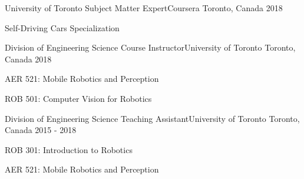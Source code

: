 

\begin{cventries}

  \cventry
    {University of Toronto} %
    {Subject Matter Expert{\awesomesep}Coursera} %
    {Toronto, Canada} %
    {2018} %
    {
      \begin{cvitems} %
        \item {Self-Driving Cars Specialization}
      \end{cvitems}
    }
    
  \cventry
    {Division of Engineering Science} %
    {Course Instructor{\awesomesep}University of Toronto} %
    {Toronto, Canada} %
    {2018} %
    {
      \begin{cvitems} %
        \item {AER 521: Mobile Robotics and Perception}
        \item {ROB 501: Computer Vision for Robotics}
      \end{cvitems}
    }

    \cventry
    {Division of Engineering Science} %
    {Teaching Assistant{\awesomesep}University of Toronto} %
    {Toronto, Canada} %
    {2015 - 2018} %
    {
      \begin{cvitems} %
        \item {ROB 301: Introduction to Robotics}
        \item {AER 521: Mobile Robotics and Perception}
      \end{cvitems}
    }

\end{cventries}
